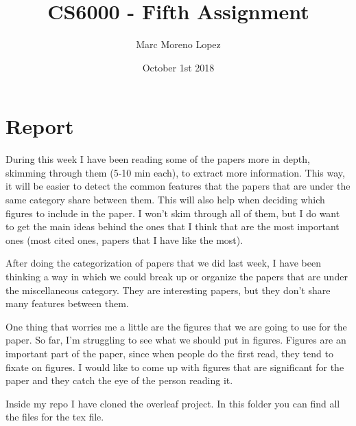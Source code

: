 \documentclass{article}
\title{CS6000 - Fifth Assignment}
\author{Marc Moreno Lopez}
\date{October 1st 2018}
\begin{document}
\maketitle

\section{Report}


During this week I have been reading some of the papers more in depth, skimming through them (5-10 min each), to extract more information. This way, it will be easier to detect the common features that the papers that are under the same category share between them. This will also help when deciding which figures to include in the paper. I won’t skim through all of them, but I do want to get the main ideas behind the ones that I think that are the most important ones (most cited ones, papers that I have like the most).

After doing the categorization of papers that we did last week, I have been thinking a way in which we could break up or organize the papers that are under the miscellaneous category. They are interesting papers, but they don’t share many features between them. 

One thing that worries me a little are the figures that we are going to use for the paper. So far, I’m struggling to see what we should put in figures. Figures are an important part of the paper, since when people do the first read, they tend to fixate on figures. I would like to come up with figures that are significant for the paper and they catch the eye of the person reading it.

Inside my repo I have cloned the overleaf project. In this folder you can find all the files for the tex file.
\end{document}
